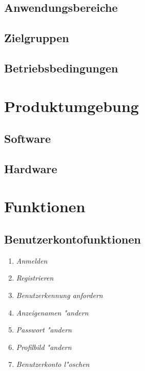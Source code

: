 \documentclass[parskip=full]{scrartcl}
\def\threedigits#1{%
  \ifnum#1<100 0\fi
  \ifnum#1<10 0\fi
  \number#1}
\begin{document}
\subsection{Anwendungsbereiche}
\subsection{Zielgruppen}
\subsection{Betriebsbedingungen}


\section{Produktumgebung}

\subsection{Software}
\subsection{Hardware}


\section{Funktionen}

\subsection{Benutzerkontofunktionen}

\begin{enumerate}[label={\textbf{/F\protect\threedigits{\theenumi}0/}}, leftmargin=*]
	\item \textit{Anmelden}
	\item \textit{Registrieren}
	\item \textit{Benutzerkennung anfordern}
	\item \textit{Anzeigenamen "andern}
	\item \textit{Passwort "andern}
	\item \textit{Profilbild "andern}
	\item \textit{Benutzerkonto l"oschen}
\end{enumerate}
\end{document}
